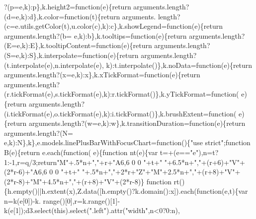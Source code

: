 \begin{DoxyCode}
{      ?(p=e,k):p\},k.height2=\textcolor{keyword}{function}(e)\{\textcolor{keywordflow}{return} arguments.length?(d=e,k):d\},k.color=\textcolor{keyword}{function}(t)\{\textcolor{keywordflow}{return} arguments.
      length?(c=e.utils.getColor(t),u.color(c),k):c\},k.showLegend=\textcolor{keyword}{function}(e)\{\textcolor{keywordflow}{return} arguments.length?(b=
      e,k):b\},k.tooltips=\textcolor{keyword}{function}(e)\{\textcolor{keywordflow}{return} arguments.length?(E=e,k):E\},k.tooltipContent=\textcolor{keyword}{function}(e)\{\textcolor{keywordflow}{return} 
      arguments.length?(S=e,k):S\},k.interpolate=\textcolor{keyword}{function}(e)\{\textcolor{keywordflow}{return} arguments.length?(t.interpolate(e),n.interpolate(e),
      k):t.interpolate()\},k.noData=\textcolor{keyword}{function}(e)\{\textcolor{keywordflow}{return} arguments.length?(x=e,k):x\},k.xTickFormat=\textcolor{keyword}{function}(e)\{\textcolor{keywordflow}{return}
       arguments.length?(r.tickFormat(e),s.tickFormat(e),k):r.tickFormat()\},k.yTickFormat=\textcolor{keyword}{function}(
      e)\{\textcolor{keywordflow}{return} arguments.length?(i.tickFormat(e),o.tickFormat(e),k):i.tickFormat()\},k.brushExtent=\textcolor{keyword}{function}(
      e)\{\textcolor{keywordflow}{return} arguments.length?(w=e,k):w\},k.transitionDuration=\textcolor{keyword}{function}(e)\{\textcolor{keywordflow}{return} arguments.length?(N=
      e,k):N\},k\},e.models.linePlusBarWithFocusChart=\textcolor{keyword}{function}()\{\textcolor{stringliteral}{"use strict"};\textcolor{keyword}{function} B(e)\{\textcolor{keywordflow}{return} e.each(\textcolor{keyword}{function}(
      e)\{\textcolor{keyword}{function} nt(e)\{var t=+(e==\textcolor{stringliteral}{"e"}),n=t?1:-1,r=q/3;\textcolor{keywordflow}{return}\textcolor{stringliteral}{"M"}+.5*n+\textcolor{stringliteral}{","}+r+\textcolor{stringliteral}{"A6,6 0 0 "}+t+\textcolor{stringliteral}{" "}+6.5*n+\textcolor{stringliteral}{","}+(r+6)+\textcolor{stringliteral}{"V"}+
      (2*r-6)+\textcolor{stringliteral}{"A6,6 0 0 "}+t+\textcolor{stringliteral}{" "}+.5*n+\textcolor{stringliteral}{","}+2*r+\textcolor{stringliteral}{"Z"}+\textcolor{stringliteral}{"M"}+2.5*n+\textcolor{stringliteral}{","}+(r+8)+\textcolor{stringliteral}{"V"}+(2*r-8)+\textcolor{stringliteral}{"M"}+4.5*n+\textcolor{stringliteral}{","}+(r+8)+\textcolor{stringliteral}{"V"}+(2*r-8)\}\textcolor{keyword}{
      function} rt()\{h.empty()||h.extent(x),Z.data([h.empty()?k.domain():x]).each(\textcolor{keyword}{function}(e,t)\{var n=k(e[0])-k.
      range()[0],r=k.range()[1]-k(e[1]);d3.select(\textcolor{keyword}{this}).select(\textcolor{stringliteral}{".left"}).attr(\textcolor{stringliteral}{"width"},n<0?0:n),
}
\end{DoxyCode}
